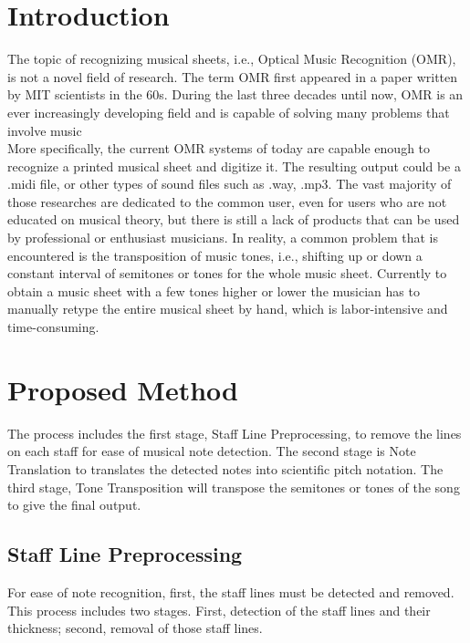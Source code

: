 \documentclass[a4paper,12pt]{report}
\begin{document}



\section{Introduction}

The topic of recognizing musical sheets, i.e., Optical Music Recognition (OMR),
is not a novel field of research. The term OMR first appeared in a paper written
by MIT scientists in the 60s.  During the last three decades until now, OMR is
an ever increasingly developing field and is capable of solving many problems
that involve music \cite{Shatri2020a}\\

More specifically, the current OMR systems of today are capable enough to
recognize a printed musical sheet and digitize it. The resulting output could be
a .midi file, or other types of sound files such as .way, .mp3. The vast
majority of those researches are dedicated to the common user, even for users
who are not educated on musical theory, but there is still a lack of products
that can be used by professional or enthusiast musicians. In reality, a common
problem that is encountered is the transposition of music tones, i.e., shifting up or down a constant interval of
semitones or tones for the whole music sheet. Currently to obtain a music
sheet with a few tones higher or lower the musician has to manually retype the
entire musical sheet by hand, which is labor-intensive and time-consuming.


\clearpage

\section{Proposed Method}
The process includes the first stage, Staff Line Preprocessing, to remove the
lines on each staff for ease of musical note detection. The second stage is Note
Translation to translates the detected notes into scientific pitch notation. The
third stage, Tone Transposition will transpose the semitones or tones of the
song to give the final output. 

\subsection{Staff Line Preprocessing}
For ease of note recognition, first, the staff lines must be detected and
removed. This process includes two stages. First, detection of the staff lines
and their thickness; second, removal of those staff lines.
\end{document}

